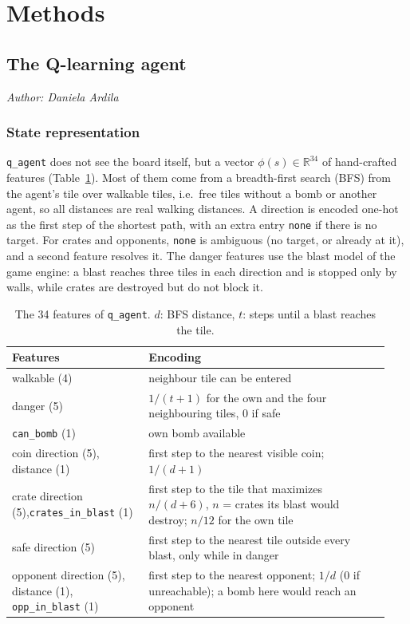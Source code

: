 \documentclass[11pt]{article}
\newcommand{\code}[1]{\texttt{#1}}
\begin{document}
\section{Methods}
\label{sec:methods}
\subsection{The Q-learning agent}
\label{sec:methods-q}
\textit{Author: Daniela Ardila}
 
\subsubsection{State representation}
\code{q\_agent} does not see the board itself, but a vector
$\phi(s) \in \mathbb{R}^{34}$ of hand-crafted features (Table~\ref{tab:q-features}).
Most of them come from a breadth-first search (BFS) from the agent's tile over
walkable tiles, i.e.\ free tiles without a bomb or another agent, so all distances
are real walking distances. A direction is encoded one-hot as the first step of the
shortest path, with an extra entry \code{none} if there is no target. For crates and
opponents, \code{none} is ambiguous (no target, or already at it), and a second
feature resolves it. The danger features use the blast model of the game engine: a
blast reaches three tiles in each direction and is stopped only by walls, while
crates are destroyed but do not block it.
 
\begin{table}[h]
\centering\small
\caption{The 34 features of \code{q\_agent}. $d$: BFS distance, $t$: steps until a
blast reaches the tile.}
\label{tab:q-features}
\begin{tabular}{@{}p{0.34\linewidth}p{0.60\linewidth}@{}}
\toprule
Features & Encoding \\
\midrule
walkable (4) & neighbour tile can be entered \\
danger (5) & $1/(t+1)$ for the own and the four neighbouring tiles, $0$ if safe \\
\code{can\_bomb} (1) & own bomb available \\
coin direction (5), distance (1) & first step to the nearest visible coin; $1/(d+1)$ \\
crate direction (5),\newline \code{crates\_in\_blast} (1) & first step to the tile that maximizes $n/(d+6)$, $n$ = crates its blast would destroy; $n/12$ for the own tile \\
safe direction (5) & first step to the nearest tile outside every blast, only while in danger \\
opponent direction (5), distance (1), \code{opp\_in\_blast} (1) & first step to the nearest opponent; $1/d$ ($0$ if unreachable); a bomb here would reach an opponent \\
\bottomrule
\end{tabular}
\end{table}
 
\end{document}
